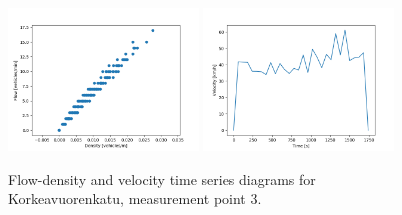 \documentclass[english, 12pt, a4paper, elec, utf8, pdfa, online]{aaltothesis}
\begin{document}
\begin{figure}[ht!]
    \centering
    \includegraphics[width=0.45\textwidth]{graphs/Korkeavuorenkatu_3_flw_dns.png}
    \includegraphics[width=0.45\textwidth]{graphs/Korkeavuorenkatu_3_spd_time_6.png}
    \caption{Flow-density and velocity time series diagrams for Korkeavuorenkatu, measurement point 3.}
\end{figure}
\end{document}
